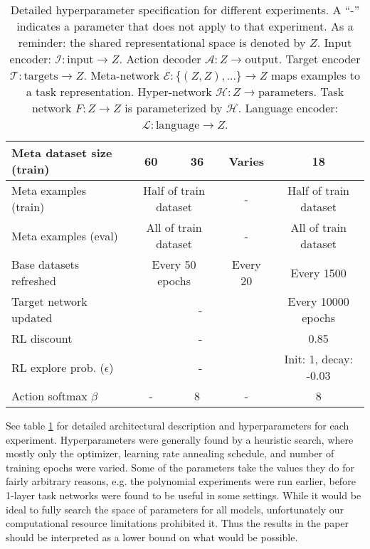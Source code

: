 \begin{table}
\begin{tabular}{|p{3cm}||c|c|c|c|}
Meta dataset size (train) & 60 & 36 & Varies & 18 \\\hline
Meta examples (train) & \multicolumn{2}{c|}{Half of train dataset} & - & Half of train dataset \\\hline
Meta examples (eval) & \multicolumn{2}{c|}{All of train dataset} & - & All of train dataset \\\hline
Base datasets refreshed & \multicolumn{2}{c|}{Every 50 epochs} & Every 20 & Every 1500  \\\hline
Target network updated & \multicolumn{3}{c|}{-} & Every 10000 epochs  \\\hline
RL discount & \multicolumn{3}{c|}{-} & 0.85 \\\hline
RL explore prob. (\(\epsilon\)) & \multicolumn{3}{c|}{-} & \multicolumn{1}{p{2.5cm}|}{Init: 1, decay: -0.03}\\\hline
Action softmax \(\beta\) & - & 8 & - & 8\\\hline
\end{tabular}
\caption[Detailed hyperparameter specification.]{Detailed hyperparameter specification for different experiments. A ``-'' indicates a parameter that does not apply to that experiment. As a reminder: the shared representational space is denoted by $Z$. Input encoder: $\mathcal{I}: \text{input} \rightarrow Z$. Action decoder $\mathcal{A}: Z \rightarrow \text{output}$. Target encoder $\mathcal{T}: \text{targets} \rightarrow Z$. Meta-network $\mathcal{E}: \{(Z, Z), ...\} \rightarrow Z $ maps examples to a task representation. Hyper-network $\mathcal{H}: Z \rightarrow \text{parameters}$. Task network $F: Z \rightarrow Z$ is parameterized by $\mathcal{H}$. Language encoder: $\mathcal{L}: \text{language} \rightarrow Z$. } \label{supp_hyperparameter_table}
\end{table}
See table \ref{supp_hyperparameter_table} for detailed architectural description and hyperparameters for each experiment. Hyperparameters were generally found by a heuristic search, where mostly only the optimizer, learning rate annealing schedule, and number of training epochs were varied. Some of the parameters take the values they do for fairly arbitrary reasons, e.g. the polynomial experiments were run earlier, before 1-layer task networks were found to be useful in some settings. While it would be ideal to fully search the space of parameters for all models, unfortunately our computational resource limitations prohibited it. Thus the results in the paper should be interpreted as a lower bound on what would be possible. \par
